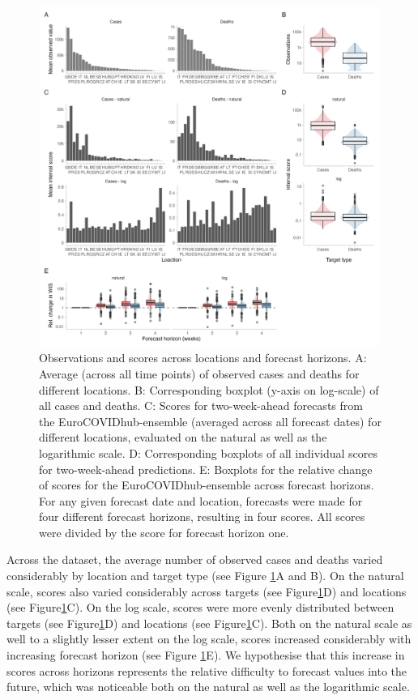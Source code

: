 \documentclass{article}
\begin{document}
\begin{figure}[h!]
    \centering
    \includegraphics[width=0.99\textwidth]{output/figures/HUB-mean-obs-location.png}
    \caption{Observations and scores across locations and forecast horizons. A: Average (across all time points) of observed cases and deaths for different locations. B: Corresponding boxplot (y-axis on log-scale) of all cases and deaths. C: Scores for two-week-ahead forecasts from the EuroCOVIDhub-ensemble (averaged across all forecast dates) for different locations, evaluated on the natural as well as the logarithmic scale. D: Corresponding boxplots of all individual scores for two-week-ahead predictions. E: Boxplots for the relative change of scores for the EuroCOVIDhub-ensemble across forecast horizons. For any given forecast date and location, forecasts were made for four different forecast horizons, resulting in four scores. All scores were divided by the score for forecast horizon one.}
    \label{fig:HUB-mean-locations}
\end{figure}

Across the dataset, the average number of observed cases and deaths varied considerably by location and target type (see Figure \ref{fig:HUB-mean-locations}A and B). On the natural scale, scores also varied considerably across targets (see Figure\ref{fig:HUB-mean-locations}D) and locations (see Figure\ref{fig:HUB-mean-locations}C). On the log scale, scores were more evenly distributed between targets (see Figure\ref{fig:HUB-mean-locations}D) and locations (see Figure\ref{fig:HUB-mean-locations}C). Both on the natural scale as well to a slightly lesser extent on the log scale, scores increased considerably with increasing forecast horizon (see Figure \ref{fig:HUB-mean-locations}E). We hypothesise that this increase in scores across horizons represents the relative difficulty to forecast values into the future, which was noticeable both on the natural as well as the logarithmic scale. 
\end{document}
